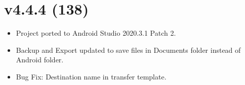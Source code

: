 \documentclass{article}
\begin{document}
    \section{v4.4.4 (138)}\label{sec:138}
    \begin{itemize}
        \item Project ported to Android Studio 2020.3.1 Patch 2.
        \item Backup and Export updated to save files in Documents folder instead of Android folder.
        \item Bug Fix: Destination name in transfer template.
    \end{itemize}
\end{document}
